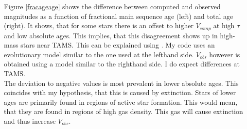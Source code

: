 \documentclass[a4paper,10pt]{article}
\begin{document}
 Figure \ref{fracageage} shows the difference between computed and observed magnitudes as a function of fractional main sequence age (left) and total age
 (right). It shows, that for some stars there is an offset to higher $V_{comp}$ at high $\tau$ and low absolute ages. This implies, that
 this disagreement shows up in high-mass stars near TAMS. This can be explained using \citep[figure 1]{2014A&A...570L..13C}. My code uses
 an evolutionary model similar to the one used at the lefthand side. $V_{obs}$ however is obtained using a model similar to the righthand
 side. I do expect differences at TAMS.\\
 The deviation to negative values is most prevalent in lower absolute ages. This coincides with my hypothesis, that this is caused by 
 extinction. Stars of lower ages are primarily found in regions of active star formation. This would mean, that they are found in regions
 of high gas density. This gas will cause extinction and thus increase $V_{obs}$. 
 
\end{document}
